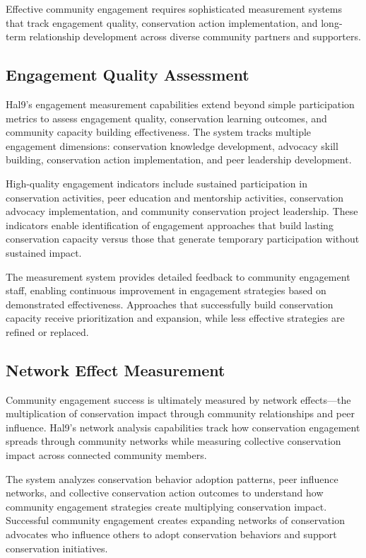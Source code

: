 \documentclass[
  Letterpaper,
]{scrbook}
\begin{document}
Effective community engagement requires sophisticated measurement
systems that track engagement quality, conservation action
implementation, and long-term relationship development across diverse
community partners and supporters.

\subsection{Engagement Quality
Assessment}\label{engagement-quality-assessment}

Hal9's engagement measurement capabilities extend beyond simple
participation metrics to assess engagement quality, conservation
learning outcomes, and community capacity building effectiveness. The
system tracks multiple engagement dimensions: conservation knowledge
development, advocacy skill building, conservation action
implementation, and peer leadership development.

High-quality engagement indicators include sustained participation in
conservation activities, peer education and mentorship activities,
conservation advocacy implementation, and community conservation project
leadership. These indicators enable identification of engagement
approaches that build lasting conservation capacity versus those that
generate temporary participation without sustained impact.

The measurement system provides detailed feedback to community
engagement staff, enabling continuous improvement in engagement
strategies based on demonstrated effectiveness. Approaches that
successfully build conservation capacity receive prioritization and
expansion, while less effective strategies are refined or replaced.

\subsection{Network Effect
Measurement}\label{network-effect-measurement}

Community engagement success is ultimately measured by network
effects---the multiplication of conservation impact through community
relationships and peer influence. Hal9's network analysis capabilities
track how conservation engagement spreads through community networks
while measuring collective conservation impact across connected
community members.

The system analyzes conservation behavior adoption patterns, peer
influence networks, and collective conservation action outcomes to
understand how community engagement strategies create multiplying
conservation impact. Successful community engagement creates expanding
networks of conservation advocates who influence others to adopt
conservation behaviors and support conservation initiatives.
\end{document}
